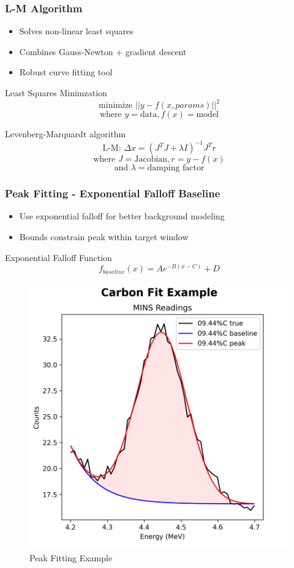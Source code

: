 \documentclass[xcolor=dvipsnames,envcountsect]{beamer}
\begin{document}
\begin{frame}
  \frametitle{L-M Algorithm}
  \begin{itemize}
    \item Solves non-linear least squares
    \item Combines Gauss-Newton + gradient descent
    \item Robust curve fitting tool
  \end{itemize}
  \begin{block}{Least Squares Minimzation}
    \begin{equation}
      \text{minimize } ||y - f(x, params)||^2
    \end{equation}
    $$
    \text{where } y = \text{data}, f(x) = \text{model}
    $$
  \end{block}
  \begin{block}{Levenberg-Marquardt algorithm}
    \begin{equation}
      \text{L-M: } \Delta x = (J^T J + \lambda I)^{-1} J^T r
    \end{equation}
    $$
      \text{where } J = \text{Jacobian}, r = y - f(x)
    $$
    $$
      \text{and } \lambda = \text{damping factor}
    $$
  \end{block}
\end{frame}

\begin{frame}
  \frametitle{Peak Fitting - Exponential Falloff Baseline}
  \begin{itemize}
    \item Use exponential falloff for better background modeling
    \item Bounds constrain peak within target window
  \end{itemize}
  \begin{block}{Exponential Falloff Function}
    \begin{equation}
      f_{baseline}(x) = A e^{-B(x - C)} + D
    \end{equation}
  \end{block}
  \begin{figure}
    \centering
    \includegraphics[width=.3\linewidth]{Figures/peakfitting.png}
    \caption{Peak Fitting Example}
    \label{fig:peakfittingexample} 
  \end{figure}
\end{frame}
\end{document}
